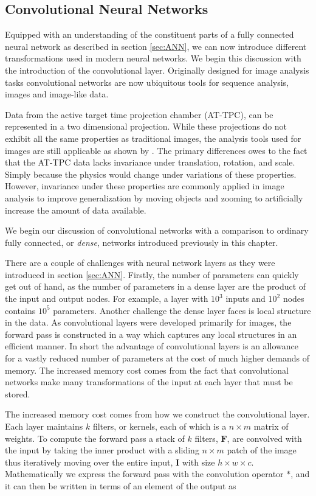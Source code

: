 \subsection{Convolutional Neural Networks}\label{sec:cnn}

Equipped with an understanding of the constituent parts of a fully connected neural network as described in section \ref{sec:ANN}, we can now introduce different transformations used in modern neural networks. We begin this discussion with the introduction of the convolutional layer. Originally designed for image analysis tasks convolutional networks are now ubiquitous tools for sequence analysis, images and image-like data. 

Data from the active target time projection chamber (AT-TPC), can be represented in a two dimensional projection. While these projections do not exhibit all the same properties as traditional images, the analysis tools used for images are still applicable as shown by \citet{Kuchera2019}. The primary differences owes to the fact that the AT-TPC data lacks invariance under translation, rotation, and scale. Simply because the physics would change under variations of these properties. However, invariance under these properties are commonly applied in image analysis to improve generalization by moving objects and zooming to artificially increase the amount of data available.

We begin our discussion of convolutional networks with a comparison to ordinary fully connected, or \textit{dense}, networks introduced previously in this chapter.

There are a couple of challenges with neural network layers as they were introduced in section \ref{sec:ANN}. Firstly, the number of parameters can quickly get out of hand, as the number of parameters in a dense layer are the product of the input and output nodes. For example, a layer with $10^3$ inputs and $10^2$ nodes contains $10^5$ parameters. Another challenge the dense layer faces is local structure in the data. As convolutional layers were developed primarily for images, the forward pass is constructed in a way which captures any local structures in an efficient manner. In short the advantage of convolutional layers is an allowance for a vastly reduced number of parameters at the cost of much higher demands of memory. The increased memory cost comes from the fact that convolutional networks make many transformations of the input at each layer that must be stored.

The increased memory cost comes from how we construct the convolutional layer. Each layer maintains $k$ filters, or kernels, each of which is a $n\times m$ matrix of weights. To compute the forward pass a stack of $k$ filters, $\mathbf{F}$, are convolved with the input by taking the inner product with a sliding $n\times m$ patch of the image thus iteratively moving over the entire input, $\mathbf{I}$ with size $h \times w \times c$. Mathematically we express the forward pass with the convolution operator $*$, and it can then be written in terms of an element of the output as

